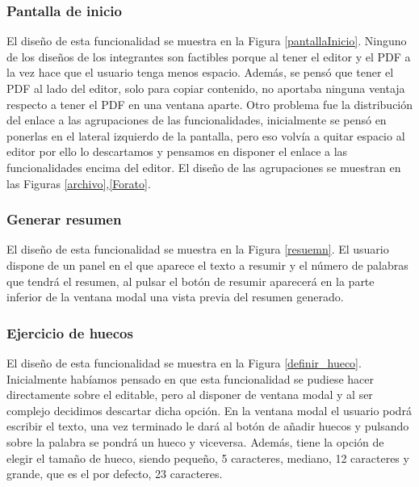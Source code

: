 \subsubsection{Pantalla de inicio}
El diseño de esta funcionalidad se muestra en la Figura \ref{pantallaInicio}. Ninguno de los diseños de los integrantes son factibles porque al tener el editor y el PDF a la vez hace que el usuario tenga menos espacio. Además, se pensó que tener el PDF al lado del editor, solo para copiar contenido, no aportaba ninguna ventaja respecto a tener el PDF en una ventana aparte. Otro problema fue la distribución del enlace a las agrupaciones de las funcionalidades, inicialmente se pensó en ponerlas en el lateral izquierdo de la pantalla, pero eso volvía a quitar espacio al editor por ello lo descartamos y pensamos en disponer el enlace a las funcionalidades encima del editor. El diseño de las agrupaciones se muestran en las Figuras \ref{archivo},\ref{Forato}.

\subsubsection{Generar resumen}
El diseño de esta funcionalidad se muestra en la Figura \ref{resuemn}. El usuario dispone de un panel en el que aparece el texto a resumir y el número de palabras que tendrá el resumen, al pulsar el botón de resumir aparecerá en la parte inferior de la ventana modal una vista previa del resumen generado. 

\subsubsection{Ejercicio de huecos}
El diseño de esta funcionalidad se muestra en la Figura \ref{definir_hueco}. Inicialmente habíamos pensado en que esta funcionalidad se pudiese hacer directamente sobre el editable, pero al disponer de ventana modal y al ser complejo decidimos descartar dicha opción. En la ventana modal el usuario podrá escribir el texto, una vez terminado le dará al botón de añadir huecos y pulsando sobre la palabra se pondrá un hueco y viceversa. Además, tiene la opción de elegir el tamaño de hueco, siendo pequeño, 5 caracteres, mediano, 12 caracteres y grande, que es el por defecto, 23 caracteres.  

